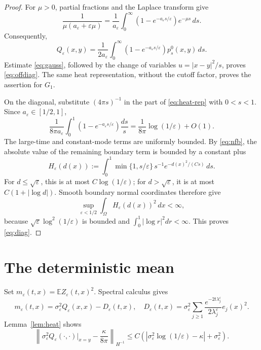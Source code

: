 \documentclass[11pt]{article}
\newcommand{\E}{\mathbb E}
\newcommand{\Om}{\Omega}
\begin{document}
\begin{proof}
For $\mu>0$, partial fractions and the Laplace transform give
\[
 \frac1{\mu(a_\varepsilon+\varepsilon\mu)}
 =\frac1{a_\varepsilon}
   \int_0^\infty(1-e^{-a_\varepsilon s/\varepsilon})e^{-\mu s}\,ds.
\]
Consequently,
\begin{equation}\label{eq:heat-rep}
 Q_\varepsilon(x,y)
 =\frac1{2a_\varepsilon}\int_0^\infty
 (1-e^{-a_\varepsilon s/\varepsilon})p_s^0(x,y)\,ds.
\end{equation}
Estimate \eqref{eq:gauss}, followed by the change of variables
$u=|x-y|^2/s$, proves \eqref{eq:offdiag}.  The same heat representation,
without the cutoff factor, proves the assertion for $G_1$.

On the diagonal, substitute $(4\pi s)^{-1}$ in the part of
\eqref{eq:heat-rep} with $0<s<1$.  Since $a_\varepsilon\in[1/2,1]$,
\[
 \frac1{8\pi a_\varepsilon}\int_0^1
 (1-e^{-a_\varepsilon s/\varepsilon})\frac{ds}{s}
 =\frac1{8\pi}\log(1/\varepsilon)+O(1).
\]
The large-time and constant-mode terms are uniformly bounded.  By
\eqref{eq:nfb}, the absolute value of the remaining boundary term is bounded
by a constant plus
\[
 H_\varepsilon(d(x))
 :=\int_0^1\min\{1,s/\varepsilon\}\,
 s^{-1}e^{-d(x)^2/(Cs)}\,ds.
\]
For $d\leq\sqrt\varepsilon$, this is at most $C\log(1/\varepsilon)$;
for $d>\sqrt\varepsilon$, it is at most $C(1+|\log d|)$.  Smooth boundary
normal coordinates therefore give
\[
 \sup_{\varepsilon<1/2}\int_\Om H_\varepsilon(d(x))^2\,dx<\infty,
\]
because $\sqrt\varepsilon\log^2(1/\varepsilon)$ is bounded and
$\int_0^1|\log r|^2dr<\infty$.  This proves \eqref{eq:diag}.
\end{proof}

\section{The deterministic mean}

Set $m_\varepsilon(t,x)=\E Z_\varepsilon(t,x)^2$.  Spectral calculus gives
\begin{equation}\label{eq:mean}
 m_\varepsilon(t,x)
 =\sigma_\varepsilon^2 Q_\varepsilon(x,x)
 -D_\varepsilon(t,x),
\quad
 D_\varepsilon(t,x)
 =\sigma_\varepsilon^2\sum_{j\geq1}
 \frac{e^{-2t\lambda_j^\varepsilon}}{2\lambda_j^\varepsilon}e_j(x)^2.
\end{equation}
Lemma~\ref{lem:heat} shows
\begin{equation}\label{eq:stationary-mean}
 \left\|\sigma_\varepsilon^2Q_\varepsilon(\cdot,\cdot)|_{x=y}
 -\frac\kappa{8\pi}\right\|_{H^{-1}}
 \leq C\left(
 |\sigma_\varepsilon^2\log(1/\varepsilon)-\kappa|
 +\sigma_\varepsilon^2\right).
\end{equation}
\end{document}
